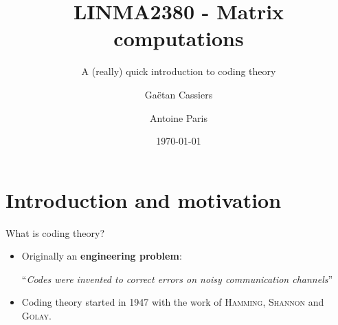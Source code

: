 \documentclass[10pt]{beamer}
\title{LINMA2380 - Matrix computations}
\subtitle{A (really) quick introduction to coding theory}
\date{\today}
\author{Gaëtan Cassiers\and Antoine Paris}
\institute{Ecole polytechnique de Louvain}
\begin{document}
\maketitle

\section{Introduction and motivation}
\begin{frame}{What is coding theory?}
    \begin{itemize}
        \item Originally an \textbf{engineering problem}:
        \begin{center}
            ``\textit{Codes were invented to correct errors on noisy communication channels}''
            \cite{macwilliams}
        \end{center}
        \item Coding theory started in 1947 with the work of \textsc{Hamming},
        \textsc{Shannon} and \textsc{Golay}.
    \end{itemize}


\end{frame}
\end{document}
